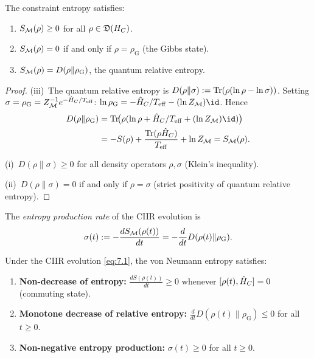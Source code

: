 \begin{lemma}
\label{lem:7.6}
The constraint entropy satisfies:
\begin{enumerate}
  \item[\textup{(i)}] $S_{\mathcal{M}}(\rho) \geq 0$ for all
    $\rho \in \mathfrak{D}(H_C)$.
  \item[\textup{(ii)}] $S_{\mathcal{M}}(\rho) = 0$ if and only if
    $\rho = \rho_{\mathrm{G}}$ \textup{(}the Gibbs state\textup{)}.
  \item[\textup{(iii)}] $S_{\mathcal{M}}(\rho) = D(\rho \| \rho_{\mathrm{G}})$,
    the quantum relative entropy.
\end{enumerate}
\end{lemma}

\begin{proof}
(iii)~The quantum relative entropy is
$D(\rho\|\sigma) := \mathrm{Tr}(\rho(\ln\rho - \ln\sigma))$.  Setting
$\sigma = \rho_{\mathrm{G}} = Z_{\mathcal{M}}^{-1}e^{-\hat{H}_C/T_{\mathrm{eff}}}$:
$\ln\rho_{\mathrm{G}} = -\hatH_C/T_{\mathrm{eff}} - (\ln Z_\CM)\id$.
Hence
\begin{align*}
  D(\rho\|\rho_{\mathrm{G}})
  &= \Tr\!\bigl(\rho(\ln\rho + \hatH_C/T_{\mathrm{eff}} +
    (\ln Z_\CM)\id)\bigr) \\
  &= -S(\rho) + \frac{\Tr(\rho\hatH_C)}{T_{\mathrm{eff}}} + \ln Z_\CM
  = S_\CM(\rho).
\end{align*}

(i)~$D(\rho\|\sigma) \geq 0$ for all density operators $\rho, \sigma$
(Klein's inequality).

(ii)~$D(\rho\|\sigma) = 0$ if and only if $\rho = \sigma$ (strict
positivity of quantum relative entropy).
\end{proof}

\begin{definition}
\label{def:7.11}
The \emph{entropy production rate} of the CIIR evolution is
\[
  \sigma(t) := -\frac{dS_{\mathcal{M}}(\rho(t))}{dt}
  = -\frac{d}{dt} D(\rho(t) \| \rho_{\mathrm{G}}).
\]
\end{definition}

\begin{theorem}
\label{thm:7.5}
Under the CIIR evolution \eqref{eq:7.1}, the von Neumann entropy
satisfies:
\begin{enumerate}
  \item[\textup{(i)}] \textbf{Non-decrease of entropy:}
    $\frac{dS(\rho(t))}{dt} \geq 0$ whenever
    $[\rho(t), \hat{H}_C] = 0$ \textup{(}commuting state\textup{)}.
  \item[\textup{(ii)}] \textbf{Monotone decrease of relative entropy:}
    $\frac{d}{dt} D(\rho(t) \| \rho_{\mathrm{G}}) \leq 0$ for all
    $t \geq 0$.
  \item[\textup{(iii)}] \textbf{Non-negative entropy production:}
    $\sigma(t) \geq 0$ for all $t \geq 0$.
\end{enumerate}
\end{theorem}

